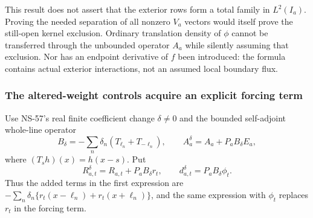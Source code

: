 \documentclass[11pt]{article}
\theoremstyle{remark}
\begin{document}
This result does not assert that the exterior rows form a total family
in $L^2(I_a)$. Proving the needed separation of all nonzero $V_a$
vectors would itself prove the still-open kernel exclusion. Ordinary
translation density of $\phi$ cannot be transferred through the
unbounded operator $A_a$ while silently assuming that exclusion.
Nor has an endpoint derivative of $f$ been introduced: the formula
contains actual exterior interactions, not an assumed local boundary flux.

\subsubsection*{The altered-weight controls acquire an explicit forcing term}

Use NS-57's real finite coefficient change $\delta\ne0$ and the
bounded self-adjoint whole-line operator
\[
 B_\delta=-\sum_n\delta_n(T_{\ell_n}+T_{-\ell_n}),\qquad
 A_a^\delta=A_a+P_a B_\delta E_a,
\]
where $(T_s h)(x)=h(x-s)$. Put
\[
 R_{a,t}^\delta=R_{a,t}+P_aB_\delta r_t,
 \qquad d_{a,t}^\delta=P_aB_\delta\phi_t.
\]
Thus the added terms in the first expression are
$-\sum_n\delta_n\{r_t(x-\ell_n)+r_t(x+\ell_n)\}$, and the
same expression with $\phi_t$ replaces $r_t$ in the forcing term.
\end{document}
